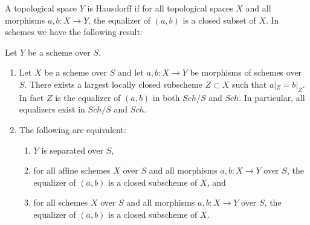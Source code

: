 A topological space $Y$ is Hausdorff if for all topological spaces $X$
and all morphisms $a,b:X\to Y$, the equalizer of $(a,b)$ is a closed subset of $X$.
In schemes we have the following result:

\begin{lemma}
\label{lemma-where-are-they-equal}
Let $Y$ be a scheme over $S$.
\begin{enumerate}
\item Let $X$ be a scheme over $S$ and let
$a, b : X \to Y$ be morphisms of schemes over $S$.
There exists a largest locally closed subscheme
$Z \subset X$ such that $a|_Z = b|_Z$. In fact $Z$ is
the equalizer of $(a, b)$ in both $Sch/S$ and $Sch$.
In particular, all equalizers exist in $Sch/S$ and $Sch$.
\item The following are equivalent:
\begin{enumerate}
\item $Y$ is separated over $S$,
\item for all affine schemes $X$ over $S$ and all morphisms $a,b:X\to Y$
over $S$, the equalizer of $(a,b)$ is a closed subscheme of $X$, and
\item for all schemes $X$ over $S$ and all morphisms $a,b:X\to Y$
over $S$, the equalizer of $(a,b)$ is a closed subscheme of $X$.
\end{enumerate}
\end{enumerate}
\end{lemma}

